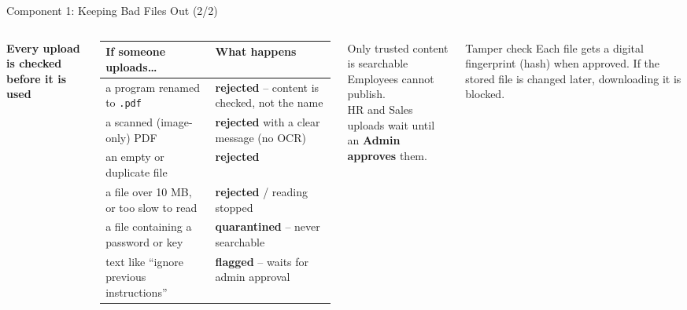 \documentclass[aspectratio=169,11pt]{beamer}
\newcommand{\code}[1]{\texttt{\small #1}}
\begin{document}
\begin{frame}{Component 1: Keeping Bad Files Out \hfill{\normalsize\color{white}(2/2)}}
  \begin{columns}[T]
      \textbf{Every upload is checked before it is used}\\[0.4em]
      \footnotesize
      \renewcommand{\arraystretch}{1.25}
      \begin{tabular}{@{}L{3.5cm}L{3.9cm}@{}}
        \toprule
        \textbf{If someone uploads\ldots} & \textbf{What happens} \\
        \midrule
        a program renamed to \code{.pdf} & \textbf{rejected} -- content is checked, not the name \\
        a scanned (image-only) PDF & \textbf{rejected} with a clear message (no OCR) \\
        an empty or duplicate file & \textbf{rejected} \\
        a file over 10 MB, or too slow to read & \textbf{rejected} / reading stopped \\
        a file containing a password or key & \textbf{quarantined} -- never searchable \\
        text like ``ignore previous instructions'' & \textbf{flagged} -- waits for admin approval \\
        \bottomrule
      \end{tabular}
      \begin{alertblock}{Only trusted content is searchable}\small
        Employees cannot publish.\\
        HR and Sales uploads wait until an \textbf{Admin approves} them.
      \end{alertblock}
      \begin{block}{Tamper check}\small
        Each file gets a digital fingerprint (hash) when approved.
        If the stored file is changed later, downloading it is blocked.
      \end{block}
  \end{columns}
\end{frame}
\end{document}
